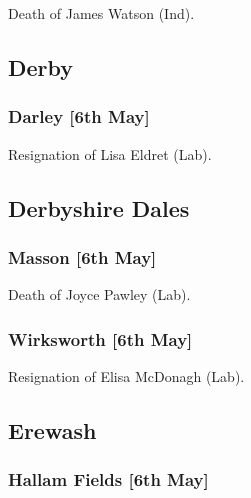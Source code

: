\documentclass[a4paper,openany]{book}
\begin{document}
\begin{resultsiii}

Death of James Watson (Ind).

\subsection*{Derby}

\subsubsection*{Darley \hspace*{\fill}\nolinebreak[1]%
	\enspace\hspace*{\fill}
	[6th May]}


Resignation of Lisa Eldret (Lab).

\subsection*{Derbyshire Dales}

\subsubsection*{Masson \hspace*{\fill}\nolinebreak[1]%
	\enspace\hspace*{\fill}
	[6th May]}


Death of Joyce Pawley (Lab).

\subsubsection*{Wirksworth \hspace*{\fill}\nolinebreak[1]%
	\enspace\hspace*{\fill}
	[6th May]}


Resignation of Elisa McDonagh (Lab).

\subsection*{Erewash}

\subsubsection*{Hallam Fields \hspace*{\fill}\nolinebreak[1]%
	\enspace\hspace*{\fill}
	[6th May]}


\end{resultsiii}
\end{document}

